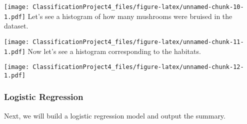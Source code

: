\documentclass[
]{article}
\newenvironment{Shaded}{\begin{snugshade}}{\end{snugshade}}
\newcommand{\AttributeTok}[1]{\textcolor[rgb]{0.77,0.63,0.00}{#1}}
\newcommand{\FunctionTok}[1]{\textcolor[rgb]{0.00,0.00,0.00}{#1}}
\newcommand{\NormalTok}[1]{#1}
\newcommand{\SpecialCharTok}[1]{\textcolor[rgb]{0.00,0.00,0.00}{#1}}
\newcommand{\StringTok}[1]{\textcolor[rgb]{0.31,0.60,0.02}{#1}}
\begin{document}
\texttt{[image: ClassificationProject4\_files/figure-latex/unnamed-chunk-10-1.pdf]}
Let's see a histogram of how many mushrooms were bruised in the dataset.

\begin{Shaded}
\end{Shaded}

\texttt{[image: ClassificationProject4\_files/figure-latex/unnamed-chunk-11-1.pdf]}
Now let's see a histogram corresponding to the habitats.

\begin{Shaded}
\end{Shaded}

\texttt{[image: ClassificationProject4\_files/figure-latex/unnamed-chunk-12-1.pdf]}

\hypertarget{logistic-regression}{%
\subsubsection{Logistic Regression}\label{logistic-regression}}

Next, we will build a logistic regression model and output the summary.
\end{document}
